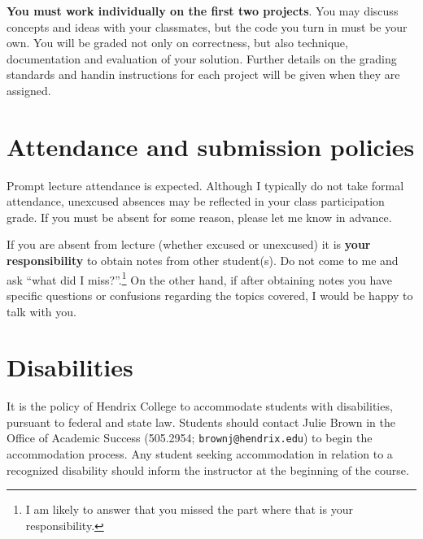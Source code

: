\documentclass{article}
\begin{document}
\textbf{You must work individually on the first two projects}. You may
discuss concepts and ideas with your classmates, but the code you turn
in must be your own. You will be graded not only on correctness, but
also technique, documentation and evaluation of your solution. Further
details on the grading standards and handin instructions for each
project will be given when they are assigned.


\section*{Attendance and submission policies}

Prompt lecture attendance is expected.  Although I typically do not
take formal attendance, unexcused absences may be reflected in your
class participation grade.  If you must be absent for some reason,
please let me know in advance.

If you are absent from lecture (whether excused or unexcused) it is
\textbf{your responsibility} to obtain notes from other student(s).
Do not come to me and ask ``what did I miss?''.\footnote{I am likely
  to answer that you missed the part where that is your
  responsibility.} On the other hand, if after obtaining notes you
have specific questions or confusions regarding the topics covered, I
would be happy to talk with you.

\section*{Disabilities}

It is the policy of Hendrix College to accommodate students with
disabilities, pursuant to federal and state law. Students should
contact Julie Brown in the Office of Academic Success (505.2954;
\texttt{brownj@hendrix.edu}) to begin the accommodation process. Any
student seeking accommodation in relation to a recognized disability
should inform the instructor at the beginning of the course.
\end{document}
